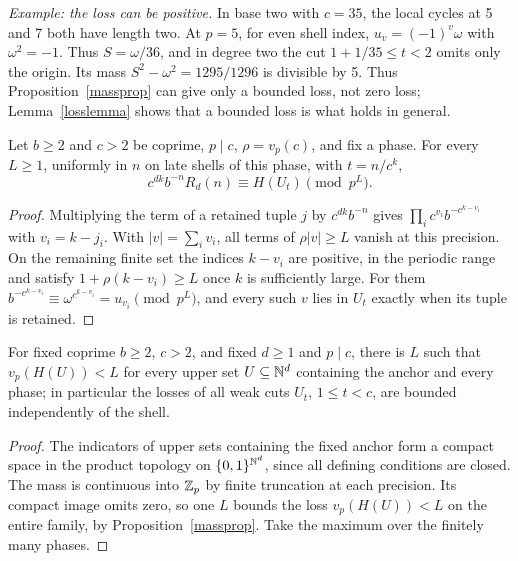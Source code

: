 \documentclass[11pt]{article}
\begin{document}
\emph{Example: the loss can be positive.} In base two with \(c=35\), the
local cycles at 5 and 7 both have length two. At \(p=5\), for even shell
index, \(u_v=(-1)^v\omega\) with \(\omega^2=-1\). Thus \(S=\omega/36\), and
in degree two the cut \(1+1/35\le t<2\) omits only the origin. Its mass
\(S^2-\omega^2=1295/1296\) is divisible by 5. Thus Proposition~\ref{massprop}
can give only a bounded loss, not zero loss; Lemma~\ref{losslemma} shows
that a bounded loss is what holds in general.

\begin{lemma}\label{refllemma}
Let \(b\ge2\) and \(c>2\) be coprime, \(p\mid c\), \(\rho=v_p(c)\), and
fix a phase. For every \(L\ge1\), uniformly in \(n\) on late shells of
this phase, with \(t=n/c^k\),
\begin{equation}\label{reflection}
 c^{dk} b^{-n}R_d(n)\equiv H(U_t)
\pmod{p^L}.
\end{equation}
\end{lemma}
\begin{proof}
Multiplying the term of a retained tuple \(j\) by \(c^{dk}b^{-n}\) gives
\(\prod_i c^{v_i}b^{-c^{k-v_i}}\) with \(v_i=k-j_i\). With \(|v|=\sum_i v_i\), all terms of \(\rho|v|\ge L\) vanish at
this precision. On the remaining finite set the indices \(k-v_i\) are
positive, in the periodic range and satisfy \(1+\rho(k-v_i)\ge L\) once
\(k\) is sufficiently large. For them
\(b^{-c^{k-v_i}}\equiv\omega^{c^{k-v_i}}=u_{v_i}\pmod{p^L}\), and every
such \(v\) lies in \(U_t\) exactly when its tuple is retained.
\end{proof}

\begin{lemma}\label{losslemma}
For fixed coprime \(b\ge2\), \(c>2\), and fixed \(d\ge1\) and \(p\mid c\),
there is \(L\) such that \(v_p(H(U))<L\) for every upper set
\(U\subseteq\mathbb N^d\) containing the anchor and every phase; in particular
the losses of all weak cuts \(U_t\), \(1\le t<c\), are bounded
independently of the shell. 
\end{lemma}
\begin{proof}
The indicators of upper sets containing the fixed anchor form a compact
space in the product topology on \(\{0,1\}^{\mathbb N^d}\), since all defining
conditions are closed. The mass is continuous into \(\mathbb Z_p\) by finite
truncation at each precision. Its compact image omits zero, so one \(L\)
bounds the loss \(v_p(H(U))<L\) on the entire family, by
Proposition~\ref{massprop}. Take the maximum over the finitely many phases.
\end{proof}
\end{document}
